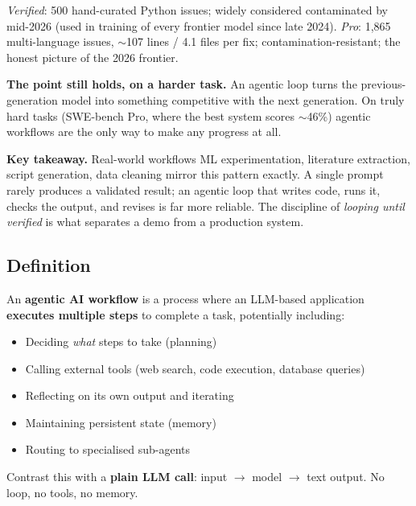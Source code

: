 \documentclass[a4paper,11pt]{article}
\begin{document}
\vspace{0.4em}
{\footnotesize\color{lighttext}%
\textit{Verified}: 500 hand-curated Python issues; widely considered
contaminated by mid-2026 (used in training of every frontier model
since late 2024). \textit{Pro}: 1{,}865 multi-language issues,
$\sim$107 lines / 4.1 files per fix; contamination-resistant; the
honest picture of the 2026 frontier.\par}

\vspace{0.6em}
\textbf{The point still holds, on a harder task.} An agentic loop
turns the previous-generation model into something competitive with
the next generation. On truly hard tasks (SWE-bench Pro, where the
best system scores $\sim$46\%) agentic workflows are the only way to
make any progress at all.

\begin{ambercallout}
\textbf{Key takeaway.}
Real-world workflows \textemdash{} ML experimentation, literature
extraction, script generation, data cleaning \textemdash{} mirror this
pattern exactly. A single prompt rarely produces a validated result;
an agentic loop that writes code, runs it, checks the output, and
revises is far more reliable. The discipline of \emph{looping until
verified} is what separates a demo from a production system.
\end{ambercallout}

\subsection{Definition}

An \textbf{agentic AI workflow} is a process where an LLM-based
application \textbf{executes multiple steps} to complete a task,
potentially including:

\begin{itemize}[noitemsep, leftmargin=1.2em]
  \item Deciding \textit{what} steps to take (planning)
  \item Calling external tools (web search, code execution, database
        queries)
  \item Reflecting on its own output and iterating
  \item Maintaining persistent state (memory)
  \item Routing to specialised sub-agents
\end{itemize}

Contrast this with a \textbf{plain LLM call}: input $\to$ model $\to$
text output. No loop, no tools, no memory.
\end{document}
